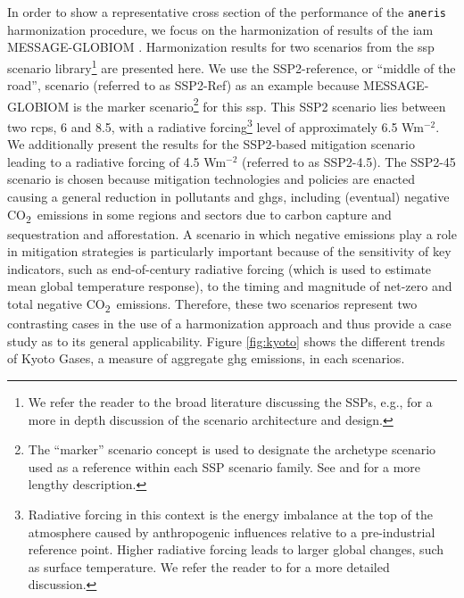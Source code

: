 \documentclass[review]{elsarticle}
\newcommand{\code}[1]{\lstinline[basicstyle=\ttfamily\color{black}]|#1|}
\newcommand{\cotwo}{CO\textsubscript{2}~}
\begin{document}
In order to show a representative cross section of the performance of the
\code{aneris} harmonization procedure, we focus on the harmonization of results
of the \gls{iam} MESSAGE-GLOBIOM \cite{fricko_marker_2017}. Harmonization
results for two scenarios from the \gls{ssp} scenario library\footnote{We refer
  the reader to the broad literature discussing the SSPs, e.g.,
  \cite{vuuren_new_2013,oneill_scenario_2016, oneill_new_2013} for a more in
  depth discussion of the scenario architecture and design.} are presented
here. We use the SSP2-reference\cite{Riahi2017153,Rao2017346}, or ``middle of
the road'', scenario (referred to as SSP2-Ref) as an example because
MESSAGE-GLOBIOM is the marker scenario\footnote{The ``marker'' scenario concept
  is used to designate the archetype scenario used as a reference within each
  SSP scenario family. See \cite{vuuren_new_2013} and \cite{Riahi2017153} for a
  more lengthy description.} for this \gls{ssp}. This SSP2 scenario lies between
two \glspl{rcp}, 6 and 8.5, with a radiative forcing\footnote{Radiative forcing
  in this context is the energy imbalance at the top of the atmosphere caused by
  anthropogenic influences relative to a pre-industrial reference point. Higher
  radiative forcing leads to larger global changes, such as surface
  temperature. We refer the reader to \cite{IPCCWG1PhysicalStocker2013} for a
  more detailed discussion.} level of approximately 6.5 Wm$^{-2}$. We
additionally present the results for the SSP2-based mitigation scenario leading
to a radiative forcing of 4.5 Wm$^{-2}$ (referred to as SSP2-4.5). The SSP2-45
scenario is chosen because mitigation technologies and policies are enacted
causing a general reduction in pollutants and \glspl{ghg}, including (eventual)
negative \cotwo emissions in some regions and sectors due to carbon capture and
sequestration and afforestation. A scenario in which negative emissions play a
role in mitigation strategies is particularly important because of the
sensitivity of key indicators, such as end-of-century radiative forcing (which
is used to estimate mean global temperature response), to the timing and
magnitude of net-zero and total negative \cotwo emissions. Therefore, these two
scenarios represent two contrasting cases in the use of a harmonization approach
and thus provide a case study as to its general applicability. Figure
\ref{fig:kyoto} shows the different trends of Kyoto Gases, a measure of
aggregate \gls{ghg} emissions, in each scenarios.
\end{document}
